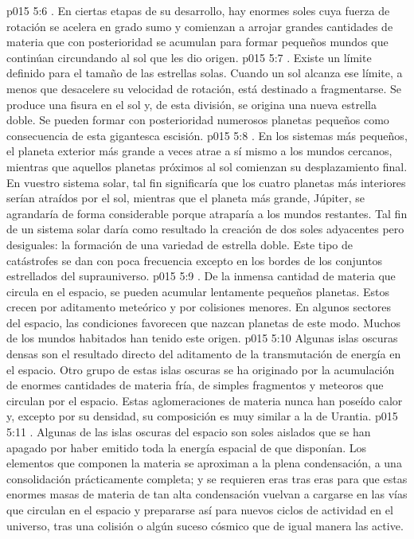 \vs p015 5:6 . En ciertas etapas de su desarrollo, hay enormes soles cuya fuerza de rotación se acelera en grado sumo y comienzan a arrojar grandes cantidades de materia que con posterioridad se acumulan para formar pequeños mundos que continúan circundando al sol que les dio origen.
\vs p015 5:7 . Existe un límite definido para el tamaño de las estrellas solas. Cuando un sol alcanza ese límite, a menos que desacelere su velocidad de rotación, está destinado a fragmentarse. Se produce una fisura en el sol y, de esta división, se origina una nueva estrella doble. Se pueden formar con posterioridad numerosos planetas pequeños como consecuencia de esta gigantesca escisión.
\vs p015 5:8 . En los sistemas más pequeños, el planeta exterior más grande a veces atrae a sí mismo a los mundos cercanos, mientras que aquellos planetas próximos al sol comienzan su desplazamiento final. En vuestro sistema solar, tal fin significaría que los cuatro planetas más interiores serían atraídos por el sol, mientras que el planeta más grande, Júpiter, se agrandaría de forma considerable porque atraparía a los mundos restantes. Tal fin de un sistema solar daría como resultado la creación de dos soles adyacentes pero desiguales: la formación de una variedad de estrella doble. Este tipo de catástrofes se dan con poca frecuencia excepto en los bordes de los conjuntos estrellados del suprauniverso.
\vs p015 5:9 . De la inmensa cantidad de materia que circula en el espacio, se pueden acumular lentamente pequeños planetas. Estos crecen por aditamento meteórico y por colisiones menores. En algunos sectores del espacio, las condiciones favorecen que nazcan planetas de este modo. Muchos de los mundos habitados han tenido este origen.
\vs p015 5:10 Algunas islas oscuras densas son el resultado directo del aditamento de la transmutación de energía en el espacio. Otro grupo de estas islas oscuras se ha originado por la acumulación de enormes cantidades de materia fría, de simples fragmentos y meteoros que circulan por el espacio. Estas aglomeraciones de materia nunca han poseído calor y, excepto por su densidad, su composición es muy similar a la de Urantia.
\vs p015 5:11 . Algunas de las islas oscuras del espacio son soles aislados que se han apagado por haber emitido toda la energía espacial de que disponían. Los elementos que componen la materia se aproximan a la plena condensación, a una consolidación prácticamente completa; y se requieren eras tras eras para que estas enormes masas de materia de tan alta condensación vuelvan a cargarse en las vías que circulan en el espacio y prepararse así para nuevos ciclos de actividad en el universo, tras una colisión o algún suceso cósmico que de igual manera las active.
